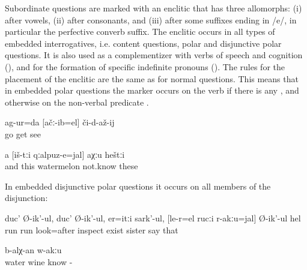 Subordinate questions are marked with an enclitic that has three allomorphs: (i)  after vowels, (ii)  after consonants, and (iii)  after some suffixes ending in /e/, in particular the perfective converb suffix. The enclitic occurs in all types of embedded interrogatives, i.e. content questions, polar and disjunctive polar questions. It is also used as a complementizer with verbs of speech and cognition (), and for the formation of specific indefinite pronouns (). The rules for the placement of the enclitic are the same as for normal questions. This means that in embedded polar questions the marker occurs on the verb if there is any , and otherwise on the non-verbal predicate .
%
\begin{exe}

	\ex	\label{ex:We went to see if (the cartridge) had struck}
	\gll	ag-ur=da	[ačː-ib=el]	či-d-až-ij\\
		go	get	see\\
	\glt	{}

	\ex	\label{ex:I don't know whether these are watermelons}
	\gll	a	[iš-tːi	qːalpuz-e=jal]	aχːu	heštːi\\
		and	this	watermelon	not.know	these\\
	\glt	{}

\end{exe}

In embedded disjunctive polar questions it occurs on all members of the disjunction:
%
\begin{exe}
	\ex	\label{ex:He ran and ran, looked around, wondering whether his sister is there or not}
	\gll	duc'	Ø-ik'-ul,	duc'	Ø-ik'-ul,	er=itːi	sark'-ul,		[le-r=el	rucːi	r-akːu=jal]	Ø-ik'-ul	hel\\
		run		run		look=after	inspect	exist	sister		say	that\\
	\glt	{}

	\ex	\label{ex:Is this water or wine, I do not know}
	\gll	[hin	ca-d=el	iχ-tːi	čaˁʁir=el]	b-alχ-an	w-akːu\\
		water			wine	know	-\\
	\glt	{}
\end{exe}

